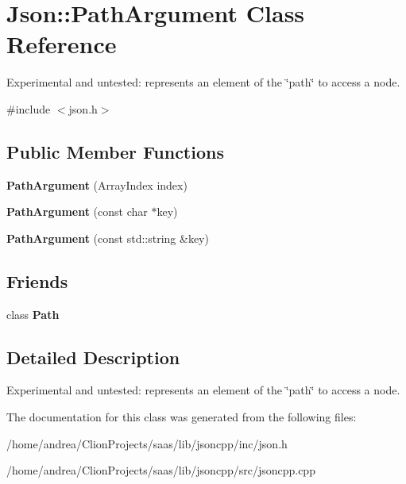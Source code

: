 \hypertarget{class_json_1_1_path_argument}{}\section{Json\+:\+:Path\+Argument Class Reference}
\label{class_json_1_1_path_argument}


Experimental and untested\+: represents an element of the \char`\"{}path\char`\"{} to access a node.  




{\ttfamily \#include $<$json.\+h$>$}

\subsection*{Public Member Functions}
\begin{DoxyCompactItemize}
\item 
{\bfseries Path\+Argument} (Array\+Index index)\hypertarget{class_json_1_1_path_argument_a53c5b27143b161301b95fd544c139ecf}{}\label{class_json_1_1_path_argument_a53c5b27143b161301b95fd544c139ecf}

\item 
{\bfseries Path\+Argument} (const char $\ast$key)\hypertarget{class_json_1_1_path_argument_a9690417a8a40e6e49f2acdf6c9281345}{}\label{class_json_1_1_path_argument_a9690417a8a40e6e49f2acdf6c9281345}

\item 
{\bfseries Path\+Argument} (const std\+::string \&key)\hypertarget{class_json_1_1_path_argument_a08f872cfee4fc600f7fa3bcaaff0d41c}{}\label{class_json_1_1_path_argument_a08f872cfee4fc600f7fa3bcaaff0d41c}

\end{DoxyCompactItemize}
\subsection*{Friends}
\begin{DoxyCompactItemize}
\item 
class {\bfseries Path}\hypertarget{class_json_1_1_path_argument_a4877239a6b7f09fbf5a61ca68a49d74c}{}\label{class_json_1_1_path_argument_a4877239a6b7f09fbf5a61ca68a49d74c}

\end{DoxyCompactItemize}


\subsection{Detailed Description}
Experimental and untested\+: represents an element of the \char`\"{}path\char`\"{} to access a node. 

The documentation for this class was generated from the following files\+:\begin{DoxyCompactItemize}
\item 
/home/andrea/\+Clion\+Projects/saas/lib/jsoncpp/inc/json.\+h\item 
/home/andrea/\+Clion\+Projects/saas/lib/jsoncpp/src/jsoncpp.\+cpp\end{DoxyCompactItemize}
